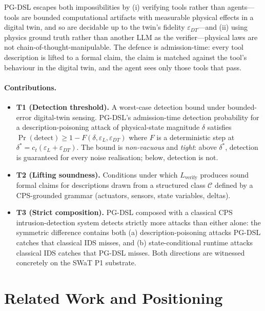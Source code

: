 \documentclass[11pt]{article}
\begin{document}
PG-DSL escapes both impossibilities by (i) verifying tools rather than
agents---tools are bounded computational artifacts with measurable physical
effects in a digital twin, and so are decidable up to the twin's fidelity
$\varepsilon_{DT}$---and (ii) using physics ground truth rather than another
LLM as the verifier---physical laws are not chain-of-thought-manipulable.
The defence is admission-time: every tool description is lifted to a formal
claim, the claim is matched against the tool's behaviour in the digital twin,
and the agent sees only those tools that pass.

\paragraph{Contributions.}
\begin{itemize}
\item \textbf{T1 (Detection threshold).}  A worst-case detection bound under
bounded-error digital-twin sensing. PG-DSL's admission-time detection
probability for a description-poisoning attack of physical-state magnitude
$\delta$ satisfies $\Pr(\text{detect}) \geq 1 - F(\delta, \varepsilon_L,
\varepsilon_{DT})$ where $F$ is a deterministic step at
$\delta^{*} = c_t (\varepsilon_L + \varepsilon_{DT})$. The bound is
\emph{non-vacuous} and \emph{tight}: above $\delta^{*}$, detection is
guaranteed for every noise realisation; below, detection is not.
\item \textbf{T2 (Lifting soundness).}  Conditions under which $L_{\text{verify}}$
produces sound formal claims for descriptions drawn from a structured class
$\mathcal{C}$ defined by a CPS-grounded grammar (actuators, sensors, state
variables, deltas).
\item \textbf{T3 (Strict composition).}  PG-DSL composed with a classical CPS
intrusion-detection system detects strictly more attacks than either alone:
the symmetric difference contains both (a) description-poisoning attacks
PG-DSL catches that classical IDS misses, and (b) state-conditional runtime
attacks classical IDS catches that PG-DSL misses. Both directions are
witnessed concretely on the SWaT P1 substrate.
\end{itemize}

\section{Related Work and Positioning}
\label{sec:related}
\end{document}
